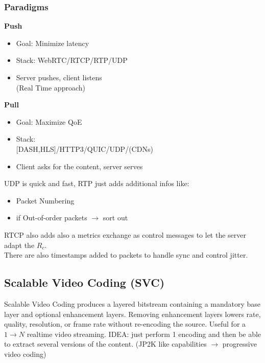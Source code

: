 \subsubsection{Paradigms}
\begin{minipage}{0.475\textwidth}
    \centering\textbf{Push}
    \begin{itemize}
        \item Goal: Minimize latency
        \item Stack: WebRTC/RTCP/RTP/UDP
        \item Server pushes, client listens\\
        (Real Time approach)
    \end{itemize}
\end{minipage}\hfill
\begin{minipage}{0.475\textwidth}
    \centering
    \textbf{Pull}
    \begin{itemize}
        \item Goal: Maximize QoE
        \item Stack:\\
        $[$DASH,HLS$]$/HTTP3/QUIC/UDP/(CDNs)
        \item Client asks for the content, server serves
    \end{itemize}
\end{minipage}
\par\medskip
UDP is quick and fast, RTP just adds additional infos like:
\begin{itemize}
    \item Packet Numbering
    \item if Out-of-order packets $\to$ sort out
\end{itemize} 
RTCP also adds also a metrics exchange as control messages to let the server adapt the $R_c$.\\
There are also timestamps added to packets to handle sync and control jitter.
\subsection{Scalable Video Coding (SVC)}
Scalable Video Coding produces a layered bitstream containing a mandatory base layer and optional enhancement layers. Removing enhancement layers lowers rate, quality, resolution, or frame rate without re-encoding the source.
Useful for a $1\to N$ realtime video streaming. IDEA: just perform 1 encoding and then be able to extract several versions of the content. (JP2K like capabilities $\to$ progressive video coding)
